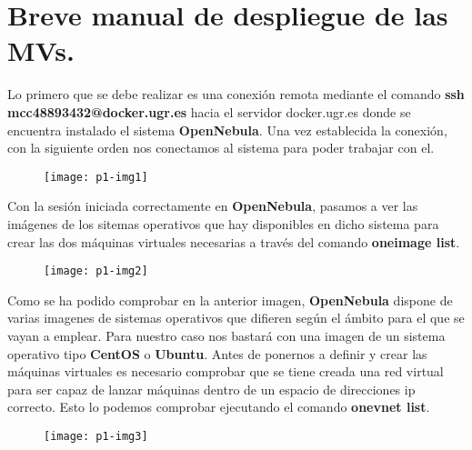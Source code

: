 \documentclass[10pt]{article}
\begin{document}
\section{Breve manual de despliegue de las MVs.} 

Lo primero que se debe realizar es una conexión remota mediante el comando \textbf{ssh mcc48893432@docker.ugr.es} hacia el servidor docker.ugr.es donde se encuentra instalado el sistema \textbf{OpenNebula}. Una vez establecida la conexión, con la siguiente orden nos conectamos al sistema para poder trabajar con el. \\

\begin{figure}[H]
	\begin{center}
 		\texttt{[image: p1-img1]}
	\end{center} 
\end{figure}

Con la sesión iniciada correctamente en \textbf{OpenNebula}, pasamos a ver las imágenes de los sitemas operativos que hay disponibles en dicho sistema para crear las dos máquinas virtuales necesarias  a través del comando \textbf{oneimage list}.\\

\begin{figure}[H]
	\begin{center}
 		\texttt{[image: p1-img2]}
	\end{center} 
\end{figure}

Como se ha podido comprobar en la anterior imagen, \textbf{OpenNebula} dispone de varias imagenes de sistemas operativos que difieren según el ámbito para el que se vayan a emplear. Para nuestro caso nos bastará con una imagen de un sistema operativo tipo \textbf{CentOS} o \textbf{Ubuntu}. Antes de ponernos a definir y crear las máquinas virtuales es necesario comprobar que se tiene creada una red virtual para ser capaz de lanzar máquinas dentro de un espacio de direcciones ip correcto. Esto lo podemos comprobar ejecutando el comando \textbf{onevnet list}.\\

 \begin{figure}[H]
	\begin{center}
 		\texttt{[image: p1-img3]}
	\end{center} 
\end{figure}
\end{document}
